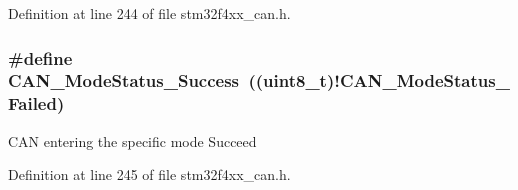 Definition at line 244 of file stm32f4xx\-\_\-can.\-h.

\hypertarget{group___c_a_n__operating__mode__status_ga7ca0ea503eb3b3a7c0abdfad27cb6579}{
\subsubsection[{C\-A\-N\-\_\-\-Mode\-Status\-\_\-\-Success}]{\setlength{\rightskip}{0pt plus 5cm}\#define C\-A\-N\-\_\-\-Mode\-Status\-\_\-\-Success~((uint8\-\_\-t)!{\bf C\-A\-N\-\_\-\-Mode\-Status\-\_\-\-Failed})}}\label{group___c_a_n__operating__mode__status_ga7ca0ea503eb3b3a7c0abdfad27cb6579}
C\-A\-N entering the specific mode Succeed 

Definition at line 245 of file stm32f4xx\-\_\-can.\-h.

